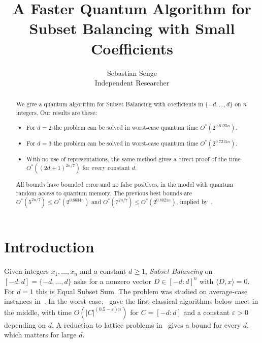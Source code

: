 \documentclass[11pt]{article}
\title{A Faster Quantum Algorithm for Subset Balancing with Small Coefficients}
\author{Sebastian Senge\\ Independent Researcher}
\date{}
\theoremstyle{remark}
\newcommand{\ip}[2]{\langle #1,#2\rangle}
\newcommand{\cc}[1]{[-#1:#1]}
\begin{document}
\maketitle

\begin{abstract}
We give a quantum algorithm for Subset Balancing with coefficients in $\{-d,\dots,d\}$ on $n$ integers. Our results are these:
\begin{itemize}[leftmargin=1.5em]
\item For $d=2$ the problem can be solved in worst-case quantum time $O^*(2^{0.6125n})$.
\item For $d=3$ the problem can be solved in worst-case quantum time $O^*(2^{0.7215n})$.
\item With no use of representations, the same method gives a direct proof of the time $O^*((2d+1)^{2n/7})$ for every constant $d$.
\end{itemize}
All bounds have bounded error and no false positives, in the model with quantum random access to quantum memory. The previous best bounds are $O^*(5^{2n/7})\le O^*(2^{0.6634n})$ and $O^*(7^{2n/7})\le O^*(2^{0.8021n})$, implied by~\cite{CKLM26}.
\end{abstract}

\section{Introduction}

Given integers $x_1,\dots,x_n$ and a constant $d\ge1$, \emph{Subset Balancing} on $\cc d=\{-d,\dots,d\}$ asks for a nonzero vector $D\in\cc d^n$ with $\ip Dx=0$. For $d=1$ this is Equal Subset Sum. The problem was studied on average-case instances in~\cite{CJRS22}. In the worst case,~\cite{RW26} gave the first classical algorithms below meet in the middle, with time $O(|C|^{(0.5-\varepsilon)n})$ for $C=\cc d$ and a constant $\varepsilon>0$ depending on $d$. A reduction to lattice problems in~\cite{GFHP26} gives a bound for every $d$, which matters for large $d$.
\end{document}
